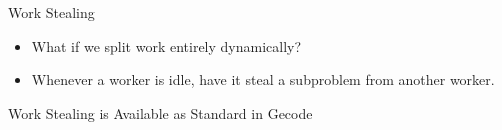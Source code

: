 \documentclass{beamer}
\begin{document}
\begin{frame}{Work Stealing}
    \begin{itemize}
        \item What if we split work entirely dynamically?
        \item Whenever a worker is idle, have it steal a subproblem from another worker.
    \end{itemize}
\end{frame}

\begin{frame}{Work Stealing is Available as Standard in Gecode}




\end{frame}
\end{document}
